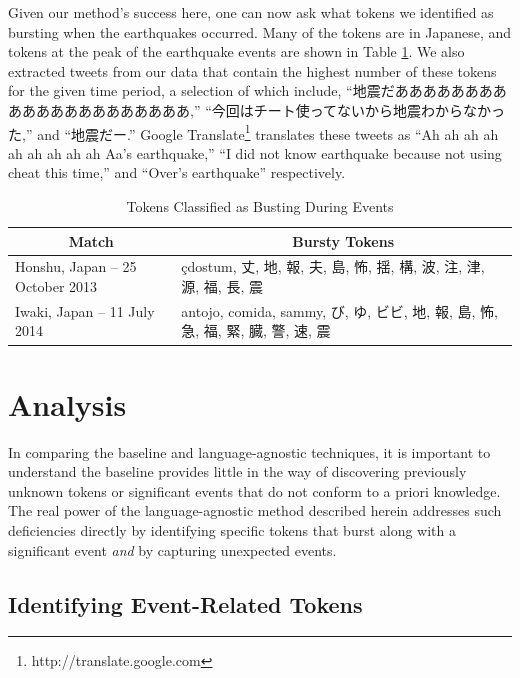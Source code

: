 \documentclass{acm_proc_article-sp}
\begin{document}
Given our method's success here, one can now ask what tokens we identified as bursting when the earthquakes occurred.
Many of the tokens are in Japanese, and tokens at the peak of the earthquake events are shown in Table \ref{tab:japanTokens}.
We also extracted tweets from our data that contain the highest number of these tokens for the given time period, a selection of which include, ``地震だあああああああああああああああああああああ,'' ``今回はチート使ってないから地震わからなかった,'' and ``地震だー.''
Google Translate\footnote{http://translate.google.com} translates these tweets as ``Ah ah ah ah ah ah ah ah ah Aa's earthquake,'' ``I did not know earthquake because not using cheat this time,'' and ``Over's earthquake'' respectively.

\begin{table}[htdp]
\caption{Tokens Classified as Busting During Events}
\begin{center}
\begin{tabular}{|p{1.45in} | p{1.45in} |}
\hline
\multicolumn{1}{|c|}{\textbf{Match}} & \multicolumn{1}{|c|}{\textbf{Bursty Tokens}} \\ \hline
Honshu, Japan -- 25 October 2013 & \c{c}dostum, 丈, 地, 報, 夫, 島, 怖, 揺, 構, 波, 注, 津, 源, 福, 長, 震 \\ \hline
Iwaki, Japan -- 11 July 2014 & antojo, comida, sammy, び, ゆ, ビビ, 地, 報, 島, 怖, 急, 福, 緊, 臓, 警, 速, 震 \\ \hline
\end{tabular}
\end{center}
\label{tab:japanTokens}
\end{table}

\section{Analysis}
\label{sect:analysis}

In comparing the baseline and language-agnostic techniques, it is important to understand the baseline provides little in the way of discovering previously unknown tokens or significant events that do not conform to a priori knowledge.
The real power of the language-agnostic method described herein addresses such deficiencies directly by identifying specific tokens that burst along with a significant event \emph{and} by capturing unexpected events.

\subsection{Identifying Event-Related Tokens}
\end{document}
